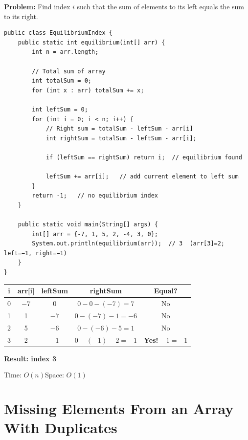 \documentclass[12pt,a4paper,oneside]{book}
\begin{document}
\textbf{Problem:} Find index $i$ such that the sum of elements to its left equals the sum to its right.

\begin{lstlisting}[caption={Equilibrium Index --- Prefix Sum approach}]
public class EquilibriumIndex {
    public static int equilibrium(int[] arr) {
        int n = arr.length;

        // Total sum of array
        int totalSum = 0;
        for (int x : arr) totalSum += x;

        int leftSum = 0;
        for (int i = 0; i < n; i++) {
            // Right sum = totalSum - leftSum - arr[i]
            int rightSum = totalSum - leftSum - arr[i];

            if (leftSum == rightSum) return i;  // equilibrium found

            leftSum += arr[i];   // add current element to left sum
        }
        return -1;   // no equilibrium index
    }

    public static void main(String[] args) {
        int[] arr = {-7, 1, 5, 2, -4, 3, 0};
        System.out.println(equilibrium(arr));  // 3  (arr[3]=2; left=−1, right=−1)
    }
}
\end{lstlisting}

\begin{dryrun}[Dry Run: arr = \{$-7$, 1, 5, 2, $-4$, 3, 0\}, totalSum = 0]
\begin{center}
\begin{tabular}{ccccc}
\toprule
\textbf{i} & \textbf{arr[i]} & \textbf{leftSum} & \textbf{rightSum} & \textbf{Equal?}\\
\midrule
0 & $-7$ & 0    & $0-0-(-7)=7$   & No\\
1 & 1    & $-7$ & $0-(-7)-1=-6$  & No\\
2 & 5    & $-6$ & $0-(-6)-5=1$   & No\\
3 & 2    & $-1$ & $0-(-1)-2=-1$  & \textbf{Yes! $-1 = -1$}\\
\bottomrule
\end{tabular}
\end{center}
\textbf{Result: index 3}
\end{dryrun}

\begin{complexity}
Time: $O(n)$\quad Space: $O(1)$
\end{complexity}

\section{Missing Elements From an Array With Duplicates}
\end{document}
